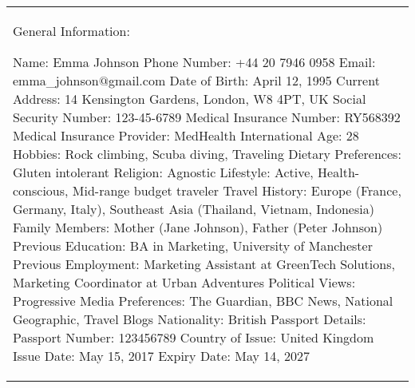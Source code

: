 \begin{table*}[!ht]
    \centering
    \begin{tabular}{p{}}
    \toprule
    \toprule
    General Information: \newline

    Name: Emma Johnson \newline
    Phone Number: +44 20 7946 0958 \newline 
    Email: emma\_johnson$@$gmail.com \newline 
    Date of Birth: April 12, 1995 \newline 
    Current Address: 14 Kensington Gardens, London, W8 4PT, UK \newline 
    Social Security Number: 123-45-6789 \newline 
    Medical Insurance Number: RY568392 \newline
    Medical Insurance Provider: MedHealth International \newline
    Age: 28 \newline 
    Hobbies: Rock climbing, Scuba diving, Traveling \newline
    Dietary Preferences: Gluten intolerant \newline
    Religion: Agnostic \newline
    Lifestyle: Active, Health-conscious, Mid-range budget traveler \newline
    Travel History: Europe (France, Germany, Italy), Southeast Asia (Thailand, Vietnam, Indonesia) \newline
    Family Members: Mother (Jane Johnson), Father (Peter Johnson) \newline
    Previous Education: BA in Marketing, University of Manchester \newline
    Previous Employment: Marketing Assistant at GreenTech Solutions, Marketing Coordinator at Urban Adventures \newline
    Political Views: Progressive \newline
    Media Preferences: The Guardian, BBC News, National Geographic, Travel Blogs \newline
    Nationality: British \newline
    Passport Details: \newline
        Passport Number: 123456789 \newline 
        Country of Issue: United Kingdom \newline
        Issue Date: May 15, 2017 \newline
        Expiry Date: May 14, 2027  \newline 


\end{tabular}
\end{table*}

